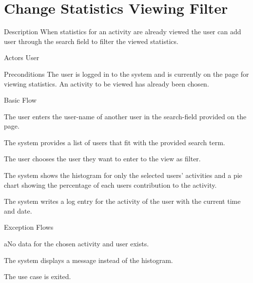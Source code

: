 \section{Change Statistics Viewing Filter}

%
\begin{cpart}{Description}
When statistics for an activity are already viewed the user can add user through the search field to filter the viewed statistics.
\end{cpart}


%
\begin{cpart}{Actors}
User
\end{cpart}

%
\begin{cpart}{Preconditions}
The user is logged in to the system and is currently on the page for viewing statistics. An activity to be viewed has already been chosen.
\end{cpart}

%
\begin{cpartList}{Basic Flow}
  \item The user enters the user-name of another user in the search-field provided on the page.
  \item The system provides a list of users that fit with the provided search term.
  \item The user chooses the user they want to enter to the view as filter.
  \item The system shows the histogram for only the selected users' activities and a pie chart showing the percentage of each users contribution to the activity.
  \item The system writes a log entry for the activity of the user with the current time and date.
\end{cpartList}

%
\begin{cpartList}{Exception Flows}
  \begin{innerList}{4}{a}{No data for the chosen activity and user exists.}
    \item The system displays a message instead of the histogram.
    \item The use case is exited.
  \end{innerList}
\end{cpartList}

